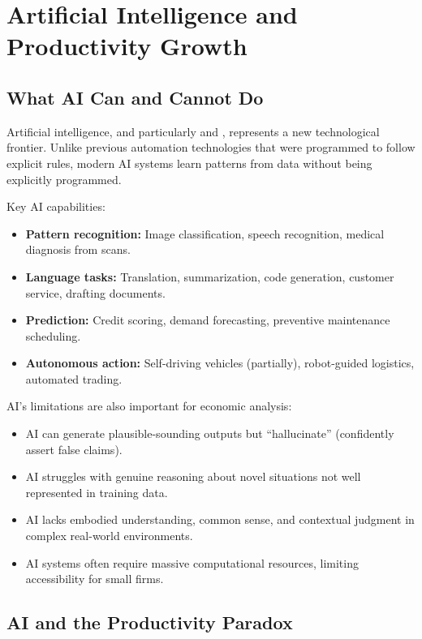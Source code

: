 \section{Artificial Intelligence and Productivity Growth}

\subsection{What AI Can and Cannot Do}

Artificial intelligence, and particularly  and , represents a new technological frontier. Unlike previous automation technologies that were programmed to follow explicit rules, modern AI systems learn patterns from data without being explicitly programmed.

Key AI capabilities:
\begin{itemize}
  \item \textbf{Pattern recognition:} Image classification, speech recognition, medical diagnosis from scans.
  \item \textbf{Language tasks:} Translation, summarization, code generation, customer service, drafting documents.
  \item \textbf{Prediction:} Credit scoring, demand forecasting, preventive maintenance scheduling.
  \item \textbf{Autonomous action:} Self-driving vehicles (partially), robot-guided logistics, automated trading.
\end{itemize}

AI's limitations are also important for economic analysis:
\begin{itemize}
  \item AI can generate plausible-sounding outputs but ``hallucinate'' (confidently assert false claims).
  \item AI struggles with genuine reasoning about novel situations not well represented in training data.
  \item AI lacks embodied understanding, common sense, and contextual judgment in complex real-world environments.
  \item AI systems often require massive computational resources, limiting accessibility for small firms.
\end{itemize}

\subsection{AI and the Productivity Paradox}

